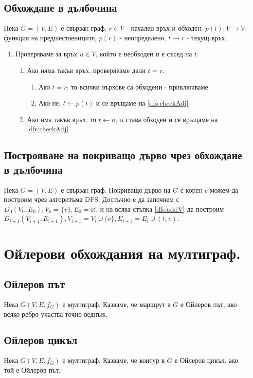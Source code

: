 \documentclass[fleqn,12pt]{article}
\begin{document}
\subsection{Обхождане в дълбочина} 
Нека $G = (V, E)$ е свързан граф, $r \in V$ - начален връх и обходен, 
$p(t) : V \rightarrow V$ - функция на предшествениците, $p(r)$ - неопределено, $t \rightarrow r$ - текущ връх.
\begin{enumerate}
	\item \label{dfs:checkAdj} Проверяваме за връх $u \in V$, който е необходен и е съсед на $t$.
	\begin{enumerate}
		\item Ако няма такъв връх, проверяваме дали $t = r$.
		\begin{enumerate}
			\item Ако $t = r$, то всички върхове са обходени - приключваме
			\item Ако не, $t \leftarrow p(t)$ и се връщаме на \ref{dfs:checkAdj}
		\end{enumerate}
		\item \label{dfs:addV} Ако има такъв връх, то $t \leftarrow u$, $u$ става обходен и се връщаме на \ref{dfs:checkAdj}
	\end{enumerate}
\end{enumerate} 

\subsection{Построяване на покриващо дърво чрез обхождане в дълбочина} 
Нека $G = (V, E)$ е свързан граф.
Покриващо дърво на $G$ с корен $v$ можем да построим чрез алгоритъма DFS. Достъчно е да започнем
с $D_0(V_0, E_0), V_0 = \{v\}, E_0 = \varnothing$, и на всяка стъпка \ref{dfs:addV} да построим
$D_{i + 1}(V_{i + 1}, E_{i + 1}), V_{i + 1} = V_i \cup \{ v \}, E_{i + 1} = E_i \cup (t, v)$.

\section{Ойлерови обхождания на мултиграф.}

\subsection{Ойлеров път} 
Нека $G(V,E,f_G)$ е мултиграф. Казваме, че маршрут в $G$ е Ойлеров път, ако всяко ребро
участва точно веднъж.

\subsection{Ойлеров цикъл} 
Нека $G(V,E,f_G)$ е мултиграф. Казваме, че контур в $G$ е Ойлеров цикъл, ако той е Ойлеров път.
\end{document}
